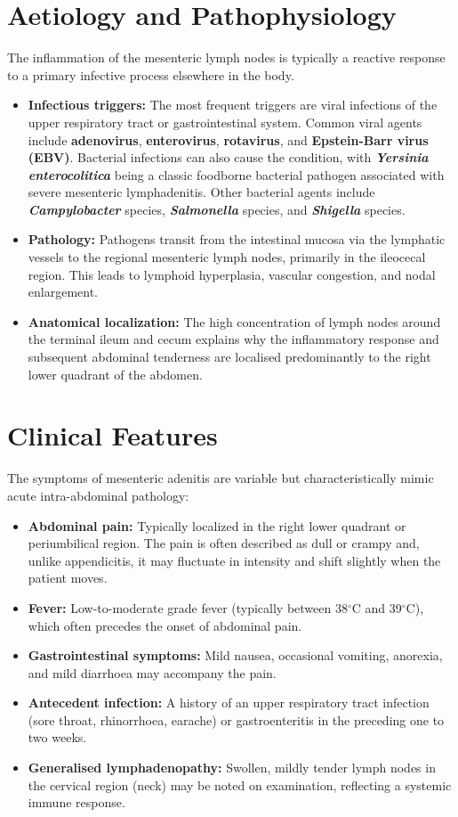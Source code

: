 \section*{Aetiology and Pathophysiology}
The inflammation of the mesenteric lymph nodes is typically a reactive response to a primary infective process elsewhere in the body.
\begin{itemize}
    \item \textbf{Infectious triggers:} The most frequent triggers are viral infections of the upper respiratory tract or gastrointestinal system. Common viral agents include \textbf{adenovirus}, \textbf{enterovirus}, \textbf{rotavirus}, and \textbf{Epstein-Barr virus (EBV)}. Bacterial infections can also cause the condition, with \textbf{\textit{Yersinia enterocolitica}} being a classic foodborne bacterial pathogen associated with severe mesenteric lymphadenitis. Other bacterial agents include \textbf{\textit{Campylobacter}} species, \textbf{\textit{Salmonella}} species, and \textbf{\textit{Shigella}} species.
    \item \textbf{Pathology:} Pathogens transit from the intestinal mucosa via the lymphatic vessels to the regional mesenteric lymph nodes, primarily in the ileocecal region. This leads to lymphoid hyperplasia, vascular congestion, and nodal enlargement.
    \item \textbf{Anatomical localization:} The high concentration of lymph nodes around the terminal ileum and cecum explains why the inflammatory response and subsequent abdominal tenderness are localised predominantly to the right lower quadrant of the abdomen.
\end{itemize}

\section*{Clinical Features}
The symptoms of mesenteric adenitis are variable but characteristically mimic acute intra-abdominal pathology:
\begin{itemize}
    \item \textbf{Abdominal pain:} Typically localized in the right lower quadrant or periumbilical region. The pain is often described as dull or crampy and, unlike appendicitis, it may fluctuate in intensity and shift slightly when the patient moves.
    \item \textbf{Fever:} Low-to-moderate grade fever (typically between 38$^\circ$C and 39$^\circ$C), which often precedes the onset of abdominal pain.
    \item \textbf{Gastrointestinal symptoms:} Mild nausea, occasional vomiting, anorexia, and mild diarrhoea may accompany the pain.
    \item \textbf{Antecedent infection:} A history of an upper respiratory tract infection (sore throat, rhinorrhoea, earache) or gastroenteritis in the preceding one to two weeks.
    \item \textbf{Generalised lymphadenopathy:} Swollen, mildly tender lymph nodes in the cervical region (neck) may be noted on examination, reflecting a systemic immune response.
\end{itemize}

